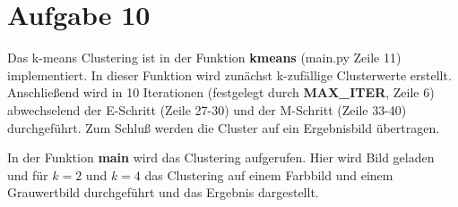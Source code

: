 \documentclass[12pt]{article}
\begin{document}

\section*{Aufgabe 10}
Das k-means Clustering ist in der Funktion \textbf{kmeans} (main.py Zeile 11) implementiert. In dieser Funktion wird zunächst k-zufällige Clusterwerte erstellt. Anschließend wird in 10 Iterationen (festgelegt durch \textbf{MAX\_ITER}, Zeile 6) abwechselend der E-Schritt (Zeile 27-30) und der M-Schritt (Zeile 33-40) durchgeführt. Zum Schluß werden die Cluster auf ein Ergebnisbild übertragen.

In der Funktion \textbf{main} wird das Clustering aufgerufen. Hier wird Bild geladen und für $k = 2$ und $k = 4$ das Clustering auf einem Farbbild und einem Grauwertbild durchgeführt und das Ergebnis dargestellt.
\end{document}
